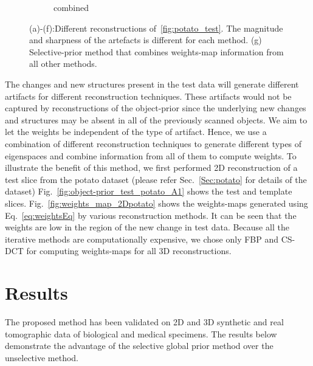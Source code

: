 \documentclass[journal]{IEEEtran}
\begin{document}
\begin{figure}[!h]
\begin{subfigure}[b]{0.24\linewidth}
        \caption{combined}
     \end{subfigure}
      \caption{(a)-(f):Different reconstructions of~\ref{fig:potato_test}. The magnitude and sharpness of the artefacts is different for each method. (g) Selective-prior method that combines weights-map information from all other methods.} 
\label{fig:reconstructions_diff_methods}
\end{figure}

The changes and new structures present in the test data will generate different artifacts for different reconstruction techniques. These artifacts would not be captured by reconstructions of the object-prior since the underlying new changes and structures may be absent in all of the previously scanned objects. We aim to let the weights be independent of the type of artifact. Hence, we use a combination of different reconstruction techniques to generate different types of eigenspaces and combine information from all of them to compute weights. To illustrate the benefit of this method, we first performed 2D reconstruction of a test slice from the potato dataset (please refer Sec.~\ref{Sec:potato} for details of the dataset) Fig.~\ref{fig:object-prior_test_potato_A1} shows the test and template slices. Fig.~\ref{fig:weights_map_2Dpotato}  shows the weights-maps generated using Eq.~\ref{eq:weightsEq} by various reconstruction methods. It can be seen that the weights are low in the region of the new change in test data. Because all the iterative methods are computationally expensive, we chose only FBP and CS-DCT for computing weights-maps for all 3D reconstructions.  


\section{Results}
\label{sec:results}

The proposed method has been validated on 2D and 3D synthetic and real tomographic data of biological and medical specimens. The results below demonstrate the advantage of the selective global prior method over the unselective method.



\end{document}
